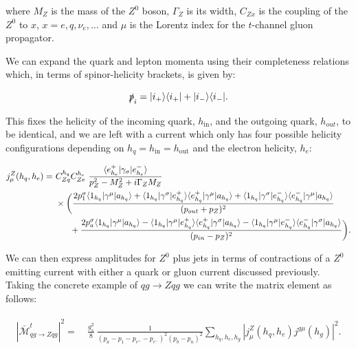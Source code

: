 		where $M_Z$ is the mass of the $Z^0$ boson, $\Gamma_Z$ is its width, $C_{Zx}$ is
		the coupling of the $Z^0$ to $x$, $x=e,q,\nu_e,\ldots$ and $\mu$ is the Lorentz
		index for the $t$-channel gluon propagator.

		We can expand the quark and lepton momenta using their completeness relations which,
		in terms of spinor-helicity brackets, is given by:

		\begin{equation}
			\slashed p_{i} = |i_+\rangle\langle i_+| + |i_-\rangle\langle i_-|.
		\end{equation}

		This fixes the helicity of the incoming quark, $h_{\text{in}}$, and the outgoing quark,
		$h_{out}$, to be identical, and we are left with a current which only has four
		possible helicity configurations depending on $h_q = h_{\text{in}} = h_{\text{out}}$ and the
		electron helicity, $h_e$:

		\begin{align}
		  \begin{split}
		    j^Z_\mu(h_q, h_e) = &\ C_{Zq}^{h_q}C_{Ze}^{h_e}\ \frac{\bk{e^+_{h_e}}{\gl{\sigma}}{e^-_{h_e}}}{p_Z^2 -
		      M^2_Z + i\Gamma_ZM_Z} \\ &\ \times\bigg(\frac{2p_1^\sigma\bk{1_{h_q}}{\gu{\mu}}{a_{h_q}} +
		      \bk{1_{h_q}}{\gu{\sigma}}{e^+_{h_q}} \bk{e^+_{h_q}}{\gu{\mu}}{a_{h_q}} +
		      \bk{1_{h_q}}{\gu{\sigma}}{e^-_{h_q}} \bk{e^-_{h_q}}{\gu{\mu}}{a_{h_q}}}
		    {(p_{out} + p_Z)^2}\\
		    &\qquad + \frac{ 2p_a^\sigma\bk{1_{h_q}}{\gu{\mu}}{a_{h_q}} -
		      \bk{1_{h_q}}{\gu{\mu}}{e^+_{h_q}} \bk{e^+_{h_q}}{\gu{\sigma}}{a_{h_q}} -
		      \bk{1_{h_q}}{\gu{\mu}}{e^-_{h_q}} \bk{e^-_{h_q}}{\gu{\sigma}}{a_{h_q}}}
		    {(p_{in} - p_Z)^2}\bigg).
		    \label{eq:Zcurrent}
		  \end{split}
		\end{align}

		We can then express amplitudes for $Z^0$ plus jets in terms of contractions of
		a $Z^0$ emitting current with either a quark or gluon current discussed previously.  Taking
		the concrete example of $qg\to Zqg$ we can write the matrix element as follows:

		\begin{align}
		\begin{split}
			{|\bar{\mathcal{M}}_{qg\to Zqg}^{t}|}^2 =& \ \frac{g_s^2}{8}\
			\frac{1}{(p_a-p_1-p_{e^+}-p_{e^-})^2 (p_b-p_n)^2}  \sum_{h_q,h_e,h_g}|
			j^{Z}_\mu(h_q,h_e) j^{g\mu}(h_g)|^2.
		  	\label{eq:qgamp}
		\end{split}
		\end{align}

